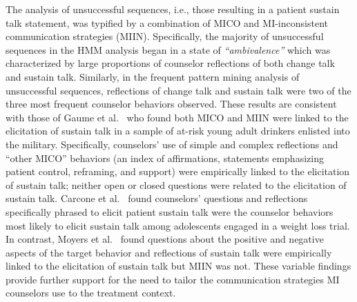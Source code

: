 The analysis of unsuccessful sequences, i.e., those resulting in a patient sustain talk statement, was typified by a combination of MICO and MI-inconsistent communication strategies (MIIN). Specifically, the majority of unsuccessful sequences in the HMM analysis began in a state of \textit{``ambivalence''} which was characterized by large proportions of counselor reflections of both change talk and sustain talk. Similarly, in the frequent pattern mining analysis of unsuccessful sequences, reflections of change talk and sustain talk were two of the three most frequent counselor behaviors observed. These results are consistent with those of Gaume et al.~\cite{gaume2010counselor} who found both MICO and MIIN were linked to the elicitation of sustain talk in a sample of at-risk young adult drinkers enlisted into the military. Specifically, counselors' use of simple and complex reflections and ``other MICO'' behaviors (an index of affirmations, statements emphasizing patient control, reframing, and support) were empirically linked to the elicitation of sustain talk; neither open or closed questions were related to the elicitation of sustain talk. Carcone et al.~\cite{carcone2013provider} found counselors' questions and reflections specifically phrased to elicit patient sustain talk were the counselor behaviors most likely to elicit sustain talk among adolescents engaged in a weight loss trial. In contrast, Moyers et al.~\cite{moyers2009session} found questions about the positive and negative aspects of the target behavior and reflections of sustain talk were empirically linked to the elicitation of sustain talk but MIIN was not. These variable findings provide further support for the need to tailor the communication strategies MI counselors use to the treatment context. 

